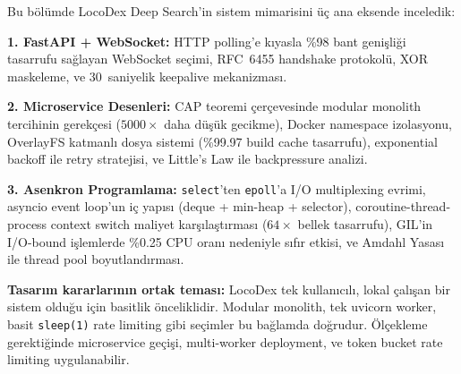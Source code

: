 \begin{ozet}
Bu b\"{o}l\"{u}mde LocoDex Deep Search'in sistem mimarisini \"{u}\c{c} ana eksende inceledik:

\textbf{1. FastAPI + WebSocket:} HTTP polling'e k{\i}yasla \%98 bant geni\c{s}li\u{g}i tasarrufu sa\u{g}layan WebSocket se\c{c}imi, RFC~6455 handshake protokol\"{u}, XOR maskeleme, ve 30~saniyelik keepalive mekanizmas{\i}.

\textbf{2. Microservice Desenleri:} CAP teoremi \c{c}er\c{c}evesinde modular monolith tercihinin gerek\c{c}esi ($5000\times$ daha d\"{u}\c{s}\"{u}k gecikme), Docker namespace izolasyonu, OverlayFS katmanl{\i} dosya sistemi (\%99.97 build cache tasarrufu), exponential backoff ile retry stratejisi, ve Little's Law ile backpressure analizi.

\textbf{3. Asenkron Programlama:} \texttt{select}'ten \texttt{epoll}'a I/O multiplexing evrimi, asyncio event loop'un i\c{c} yap{\i}s{\i} (deque + min-heap + selector), coroutine-thread-process context switch maliyet kar\c{s}{\i}la\c{s}t{\i}rmas{\i} ($64\times$ bellek tasarrufu), GIL'in I/O-bound i\c{s}lemlerde \%0.25 CPU oran{\i} nedeniyle s{\i}f{\i}r etkisi, ve Amdahl Yasas{\i} ile thread pool boyutland{\i}rmas{\i}.

\textbf{Tasar{\i}m kararlar{\i}n{\i}n ortak temas{\i}:} LocoDex tek kullan{\i}c{\i}l{\i}, lokal \c{c}al{\i}\c{s}an bir sistem oldu\u{g}u i\c{c}in basitlik \"{o}nceliklidir. Modular monolith, tek uvicorn worker, basit \texttt{sleep(1)} rate limiting gibi se\c{c}imler bu ba\u{g}lamda do\u{g}rudur. \"{O}l\c{c}ekleme gerekti\u{g}inde microservice ge\c{c}i\c{s}i, multi-worker deployment, ve token bucket rate limiting uygulanabilir.
\end{ozet}
